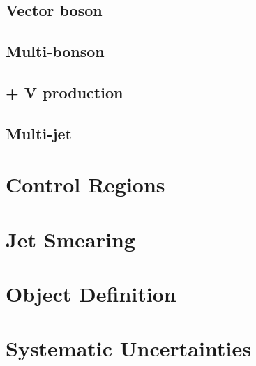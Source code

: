 \subsection{Vector boson}

\subsection{Multi-bonson}

\subsection{\ttbar + V production}

\subsection{Multi-jet}

\section{Control Regions}
\label{sec:analyses:cr}

\section{Jet Smearing}

\section{Object Definition}

\section{Systematic Uncertainties}